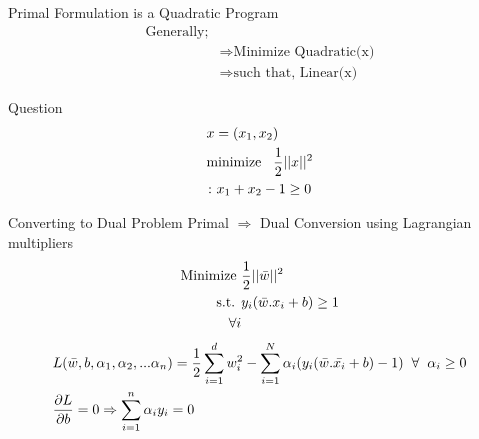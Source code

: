 \documentclass{beamer}
\begin{document}
\begin{frame}{Primal Formulation is a Quadratic Program}
\begin{align*}
\text{Generally;}&\\
&\Rightarrow \text{Minimize Quadratic(x)}\\
&\Rightarrow \text{such that, Linear(x)}
\end{align*}
\begin{tcolorbox}
Question
\begin{align*}
&{x} = (x_{1}, x_{2})\\
&\text{minimize} \hspace{3mm} \frac{1}{2}||x||^{2}\\
&\colon x_{1} + x_{2} - 1 \geq 0
\end{align*}
\end{tcolorbox}
\end{frame}



{
	
}



\begin{frame}{Converting to Dual Problem}
Primal $\Rightarrow$ Dual Conversion using Lagrangian multipliers\\
\begin{align*}
	\text{Minimize } & \frac{1}{2}||\bar{w}||^{2} \\
	\text{s.t. } & y_{i}(\bar{w}.x_{i} + b) \geq 1\\
	 \hspace{2mm}\forall i
	\end{align*}
\begin{align*}
&L(\bar{w},b,\alpha_{1},\alpha_{2},...\alpha_{n}) = \frac{1}{2}
\sum_{i = 1}^{d} w_{i}^{2} - \sum_{i=1}^{N} \alpha_{i}(y_{i}(\bar{w}.\bar{x_{i}} + b) - 1) \hspace{2mm} \forall \hspace{2mm}\alpha_{i} \geq 0\\
&\frac{\partial L}{\partial b} = 0 \Rightarrow \sum_{i=1}^{n}\alpha_{i}y_{i} = 0\\
\end{align*}
\end{frame}
\end{document}
